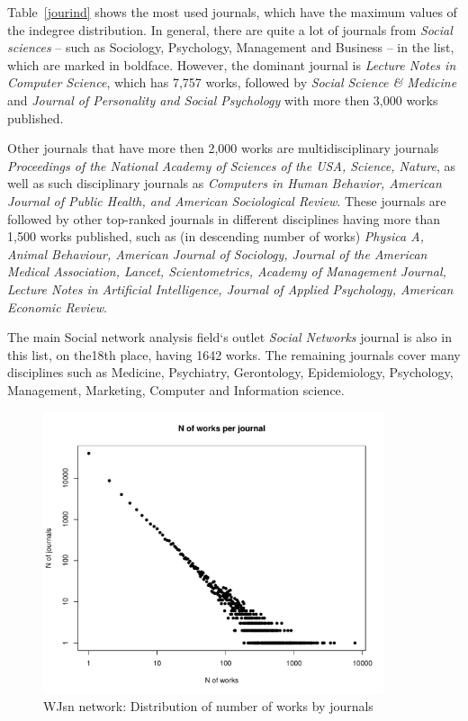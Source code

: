 \documentclass[11pt]{article} %
\begin{document}
Table~\ref{jourind} shows the most used journals, which have the maximum values of the indegree distribution. In general, there are quite a lot of journals from \textit{Social sciences} -- such as Sociology, Psychology, Management and Business -- in the list, which are marked in boldface. However, the dominant journal is \textit{Lecture Notes in Computer Science}, which has 7,757 works, followed by \textit{Social Science \& Medicine} and \textit{Journal of Personality and Social Psychology} with more then 3,000 works published. \medskip

Other journals that have more then 2,000 works are multidisciplinary journals \textit{Proceedings of the National Academy of Sciences of the USA, Science, Nature}, as well as  such disciplinary journals as \textit{Computers in Human Behavior, American Journal of Public Health, and American Sociological Review}. These journals are followed by other top-ranked journals in different disciplines having more than 1,500 works published, such as (in descending number of works) \textit{Physica A, Animal Behaviour, American Journal of Sociology, Journal of the American Medical Association,  Lancet, Scientometrics, Academy of Management Journal, Lecture Notes in Artificial Intelligence, Journal of Applied Psychology, American Economic Review}. \medskip

The main Social network analysis field`s outlet \textit{Social Networks} journal is also in this list, on the18th place, having 1642 works. The remaining journals cover many disciplines such as  Medicine, Psychiatry, Gerontology, Epidemiology, Psychology, Management, Marketing, Computer and Information science. \medskip

\begin{figure}
\centerline{\includegraphics[width=100mm]{Rplot_WJs_new_indeg.pdf}}
\caption{WJsn network: Distribution of number of works by journals}\label{worksjour}
\end{figure}
\medskip   
\end{document}
